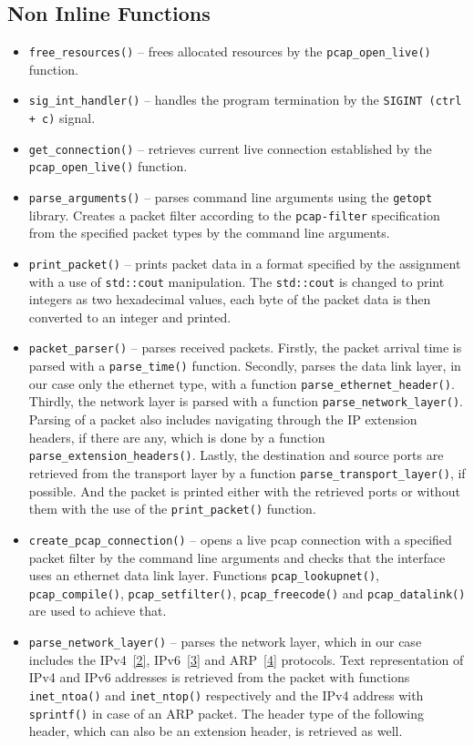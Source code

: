 \documentclass[12pt]{article}
\begin{document}
\subsection{Non Inline Functions}
\begin{itemize}
	\item \texttt{free\_resources()} -- frees allocated resources by the \texttt{pcap\_open\_live()} function.
	\item \texttt{sig\_int\_handler()} -- handles the program termination by the \texttt{SIGINT (ctrl + c)} signal.
	\item \texttt{get\_connection()} -- retrieves current live connection established by the \texttt{pcap\_open\_live()} function.
	\item \texttt{parse\_arguments()} -- parses command line arguments using the \texttt{getopt} library. Creates a packet filter according to the \texttt{pcap-filter} specification from the specified packet types by the command line arguments.
	\item \texttt{print\_packet()} -- prints packet data in a format specified by the assignment with a use of \texttt{std::cout} manipulation. The \texttt{std::cout} is changed to print integers as two hexadecimal values, each byte of the packet data is then converted to an integer and printed.
	\item \texttt{packet\_parser()} -- parses received packets. Firstly, the packet arrival time is parsed with a \texttt{parse\_time()} function. Secondly, parses the data link layer, in our case only the ethernet type, with a function \texttt{parse\_ethernet\_header()}. Thirdly, the network layer is parsed with a function \texttt{parse\_network\_layer()}. Parsing of a packet also includes navigating through the IP extension headers, if there are any, which is done by a function \texttt{parse\_extension\_headers()}. Lastly, the destination and source ports are retrieved from the transport layer by a function \texttt{parse\_transport\_layer()}, if possible. And the packet is printed either with the retrieved ports or without them with the use of the \texttt{print\_packet()} function.
	\item \texttt{create\_pcap\_connection()} -- opens a live pcap connection with a specified packet filter by the command line arguments and checks that the interface uses an ethernet data link layer. Functions \texttt{pcap\_lookupnet()}, \texttt{pcap\_compile()}, \texttt{pcap\_setfilter()}, \texttt{pcap\_freecode()} and \texttt{pcap\_datalink()} are used to achieve that.
		\item \texttt{parse\_network\_layer()} -- parses the network layer, which in our case includes the IPv4~\hyperref[cit2]{[2]}, IPv6~\hyperref[cit3]{[3]} and ARP~\hyperref[cit4]{[4]} protocols. Text representation of IPv4 and IPv6 addresses is retrieved from the packet with functions \texttt{inet\_ntoa()} and \texttt{inet\_ntop()} respectively and the IPv4 address with \texttt{sprintf()} in case of an ARP packet. The header type of the following header, which can also be an extension header, is retrieved as well.

\end{itemize}
\end{document}
